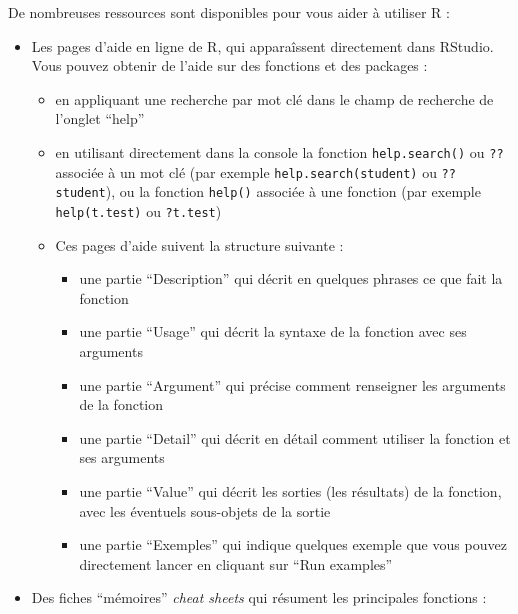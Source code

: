\documentclass[
]{book}
\providecommand{\tightlist}{%
  \setlength{\itemsep}{0pt}\setlength{\parskip}{0pt}}
\begin{document}
De nombreuses ressources sont disponibles pour vous aider à utiliser R :

\begin{itemize}
\item
  Les pages d'aide en ligne de R, qui apparaîssent directement dans RStudio. Vous pouvez obtenir de l'aide sur des fonctions et des packages :

  \begin{itemize}
  \tightlist
  \item
    en appliquant une recherche par mot clé dans le champ de recherche de l'onglet ``help''
  \item
    en utilisant directement dans la console la fonction \texttt{help.search()} ou \texttt{??} associée à un mot clé (par exemple \texttt{help.search(student)} ou \texttt{??student}), ou la fonction \texttt{help()} associée à une fonction (par exemple \texttt{help(t.test)} ou \texttt{?t.test})
  \item
    Ces pages d'aide suivent la structure suivante :

    \begin{itemize}
    \tightlist
    \item
      une partie ``Description'' qui décrit en quelques phrases ce que fait la fonction
    \item
      une partie ``Usage'' qui décrit la syntaxe de la fonction avec ses arguments
    \item
      une partie ``Argument'' qui précise comment renseigner les arguments de la fonction
    \item
      une partie ``Detail'' qui décrit en détail comment utiliser la fonction et ses arguments
    \item
      une partie ``Value'' qui décrit les sorties (les résultats) de la fonction, avec les éventuels sous-objets de la sortie
    \item
      une partie ``Exemples'' qui indique quelques exemple que vous pouvez directement lancer en cliquant sur ``Run examples''
    \end{itemize}
  \end{itemize}
\item
  Des fiches ``mémoires'' \emph{cheat sheets} qui résument les principales fonctions :


\end{itemize}
\end{document}
